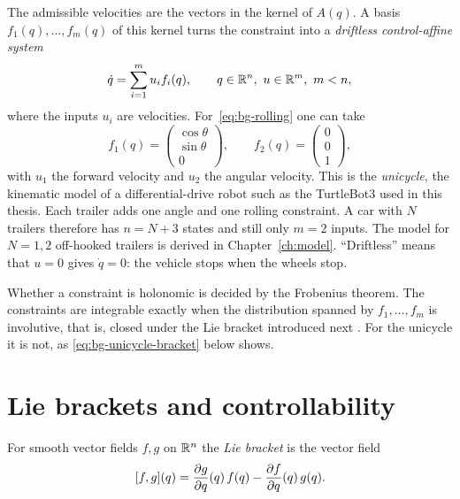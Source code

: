 The admissible velocities are the vectors in the kernel of $A(q)$. A basis
$f_1(q),\dots,f_m(q)$ of this kernel turns the constraint into a
\emph{driftless control-affine system}
\begin{equation}
  \dot q=\sum_{i=1}^{m}u_if_i(q),\qquad q\in\mathbb{R}^n,\ u\in\mathbb{R}^m,\ m<n,
  \label{eq:bg-driftless}
\end{equation}
where the inputs $u_i$ are velocities. For~\eqref{eq:bg-rolling} one can take
\begin{equation}
  f_1(q)=\begin{pmatrix}\cos\theta\\ \sin\theta\\ 0\end{pmatrix},\qquad
  f_2(q)=\begin{pmatrix}0\\ 0\\ 1\end{pmatrix},
  \label{eq:bg-unicycle}
\end{equation}
with $u_1$ the forward velocity and $u_2$ the angular velocity. This is the
\emph{unicycle}, the kinematic model of a differential-drive robot such as the
TurtleBot3 used in this thesis. Each trailer adds one angle and one rolling
constraint. A car with $N$ trailers therefore has $n=N+3$ states and still only
$m=2$ inputs. The model for $N=1,2$ off-hooked trailers is derived in
Chapter~\ref{ch:model}. ``Driftless'' means that $u=0$ gives $\dot q=0$:
the vehicle stops when the wheels stop.

Whether a constraint is holonomic is decided by the Frobenius theorem. The
constraints are integrable exactly when the distribution spanned by
$f_1,\dots,f_m$ is involutive, that is, closed under the Lie bracket introduced
next \cite{nijmeijer1990,deluca1995}. For the unicycle it is not, as
\cref{eq:bg-unicycle-bracket} below shows.

\section{Lie brackets and controllability}
\label{sec:bg-brackets}

\begin{definition}
For smooth vector fields $f,g$ on $\mathbb{R}^n$ the \emph{Lie bracket} is the vector
field
\begin{equation}
  [f,g](q)=\frac{\partial g}{\partial q}(q)\,f(q)
                   -\frac{\partial f}{\partial q}(q)\,g(q).
  \label{eq:bg-bracket}
\end{equation}
\end{definition}

